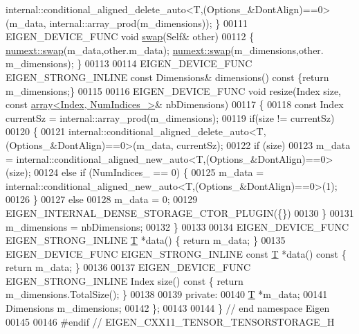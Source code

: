 \begin{DoxyCode}
      internal::conditional\_aligned\_delete\_auto<T,(Options\_&DontAlign)==0>(m\_data, internal::array\_prod(m\_dimensions)); \}
00111     EIGEN\_DEVICE\_FUNC  \textcolor{keywordtype}{void} \hyperlink{endian_8c_a3ca5ecd34b04d6a243c054ac3a57f68d}{swap}(Self& other)
00112     \{ \hyperlink{endian_8c_a3ca5ecd34b04d6a243c054ac3a57f68d}{numext::swap}(m\_data,other.m\_data); \hyperlink{endian_8c_a3ca5ecd34b04d6a243c054ac3a57f68d}{numext::swap}(m\_dimensions,other.
      m\_dimensions); \}
00113 
00114     EIGEN\_DEVICE\_FUNC EIGEN\_STRONG\_INLINE \textcolor{keyword}{const} Dimensions& dimensions()\textcolor{keyword}{ const }\{\textcolor{keywordflow}{return} m\_dimensions;\}
00115 
00116     EIGEN\_DEVICE\_FUNC \textcolor{keywordtype}{void} resize(Index size, \textcolor{keyword}{const} \hyperlink{class_eigen_1_1array}{array<Index, NumIndices\_>}& 
      nbDimensions)
00117     \{
00118       \textcolor{keyword}{const} Index currentSz = internal::array\_prod(m\_dimensions);
00119       \textcolor{keywordflow}{if}(size != currentSz)
00120       \{
00121         internal::conditional\_aligned\_delete\_auto<T,(Options\_&DontAlign)==0>(m\_data, currentSz);
00122         \textcolor{keywordflow}{if} (size)
00123           m\_data = internal::conditional\_aligned\_new\_auto<T,(Options\_&DontAlign)==0>(size);
00124         \textcolor{keywordflow}{else} \textcolor{keywordflow}{if} (NumIndices\_ == 0) \{
00125       m\_data = internal::conditional\_aligned\_new\_auto<T,(Options\_&DontAlign)==0>(1);
00126     \}
00127     \textcolor{keywordflow}{else} 
00128           m\_data = 0;
00129         EIGEN\_INTERNAL\_DENSE\_STORAGE\_CTOR\_PLUGIN(\{\})
00130       \}
00131       m\_dimensions = nbDimensions;
00132     \}
00133 
00134     EIGEN\_DEVICE\_FUNC EIGEN\_STRONG\_INLINE \hyperlink{group___sparse_core___module}{T} *data() \{ \textcolor{keywordflow}{return} m\_data; \}
00135     EIGEN\_DEVICE\_FUNC EIGEN\_STRONG\_INLINE \textcolor{keyword}{const} \hyperlink{group___sparse_core___module}{T} *data()\textcolor{keyword}{ const }\{ \textcolor{keywordflow}{return} m\_data; \}
00136 
00137     EIGEN\_DEVICE\_FUNC EIGEN\_STRONG\_INLINE Index size()\textcolor{keyword}{ const }\{ \textcolor{keywordflow}{return} m\_dimensions.TotalSize(); \}
00138 
00139  \textcolor{keyword}{private}:
00140   \hyperlink{group___sparse_core___module}{T} *m\_data;
00141   Dimensions m\_dimensions;
00142 \};
00143 
00144 \} \textcolor{comment}{// end namespace Eigen}
00145 
00146 \textcolor{preprocessor}{#endif // EIGEN\_CXX11\_TENSOR\_TENSORSTORAGE\_H}
\end{DoxyCode}
